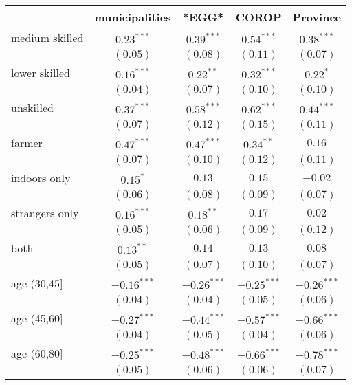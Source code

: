 
\begin{table}
\begin{center}
\begin{tabular}{l c c c c}
\hline
 & municipalities & *EGG* & COROP & Province \\
\hline
medium skilled & $0.23^{***}$  & $0.39^{***}$  & $0.54^{***}$  & $0.38^{***}$  \\
               & $(0.05)$      & $(0.08)$      & $(0.11)$      & $(0.07)$      \\
lower skilled  & $0.16^{***}$  & $0.22^{**}$   & $0.32^{***}$  & $0.22^{*}$    \\
               & $(0.04)$      & $(0.07)$      & $(0.10)$      & $(0.10)$      \\
unskilled      & $0.37^{***}$  & $0.58^{***}$  & $0.62^{***}$  & $0.44^{***}$  \\
               & $(0.07)$      & $(0.12)$      & $(0.15)$      & $(0.11)$      \\
farmer         & $0.47^{***}$  & $0.47^{***}$  & $0.34^{**}$   & $0.16$        \\
               & $(0.07)$      & $(0.10)$      & $(0.12)$      & $(0.11)$      \\
indoors only   & $0.15^{*}$    & $0.13$        & $0.15$        & $-0.02$       \\
               & $(0.06)$      & $(0.08)$      & $(0.09)$      & $(0.07)$      \\
strangers only & $0.16^{***}$  & $0.18^{**}$   & $0.17$        & $0.02$        \\
               & $(0.05)$      & $(0.06)$      & $(0.09)$      & $(0.12)$      \\
both           & $0.13^{**}$   & $0.14$        & $0.13$        & $0.08$        \\
               & $(0.05)$      & $(0.07)$      & $(0.10)$      & $(0.07)$      \\
age (30,45]    & $-0.16^{***}$ & $-0.26^{***}$ & $-0.25^{***}$ & $-0.26^{***}$ \\
               & $(0.04)$      & $(0.04)$      & $(0.05)$      & $(0.06)$      \\
age (45,60]    & $-0.27^{***}$ & $-0.44^{***}$ & $-0.57^{***}$ & $-0.66^{***}$ \\
               & $(0.04)$      & $(0.05)$      & $(0.04)$      & $(0.06)$      \\
age (60,80]    & $-0.25^{***}$ & $-0.48^{***}$ & $-0.66^{***}$ & $-0.78^{***}$ \\
               & $(0.05)$      & $(0.06)$      & $(0.06)$      & $(0.07)$      \\

\end{tabular}
\end{center}
\end{table}
